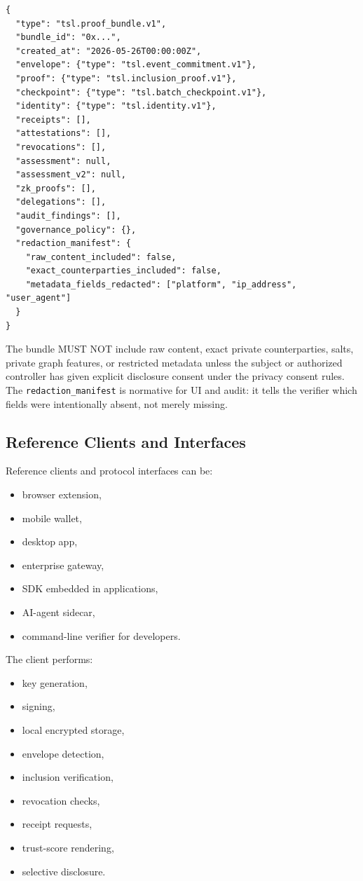 \documentclass[11pt]{article}
\begin{document}
\begin{lstlisting}[style=tslcode]
{
  "type": "tsl.proof_bundle.v1",
  "bundle_id": "0x...",
  "created_at": "2026-05-26T00:00:00Z",
  "envelope": {"type": "tsl.event_commitment.v1"},
  "proof": {"type": "tsl.inclusion_proof.v1"},
  "checkpoint": {"type": "tsl.batch_checkpoint.v1"},
  "identity": {"type": "tsl.identity.v1"},
  "receipts": [],
  "attestations": [],
  "revocations": [],
  "assessment": null,
  "assessment_v2": null,
  "zk_proofs": [],
  "delegations": [],
  "audit_findings": [],
  "governance_policy": {},
  "redaction_manifest": {
    "raw_content_included": false,
    "exact_counterparties_included": false,
    "metadata_fields_redacted": ["platform", "ip_address", "user_agent"]
  }
}
\end{lstlisting}

The bundle MUST NOT include raw content, exact private counterparties, salts, private graph features, or restricted metadata unless the subject or authorized controller has given explicit disclosure consent under the privacy consent rules. The \texttt{redaction\_manifest} is normative for UI and audit: it tells the verifier which fields were intentionally absent, not merely missing.

\subsection{Reference Clients and Interfaces}

Reference clients and protocol interfaces can be:

\begin{itemize}
    \item browser extension,
    \item mobile wallet,
    \item desktop app,
    \item enterprise gateway,
    \item SDK embedded in applications,
    \item AI-agent sidecar,
    \item command-line verifier for developers.
\end{itemize}

The client performs:

\begin{itemize}
    \item key generation,
    \item signing,
    \item local encrypted storage,
    \item envelope detection,
    \item inclusion verification,
    \item revocation checks,
    \item receipt requests,
    \item trust-score rendering,
    \item selective disclosure.
\end{itemize}
\end{document}

